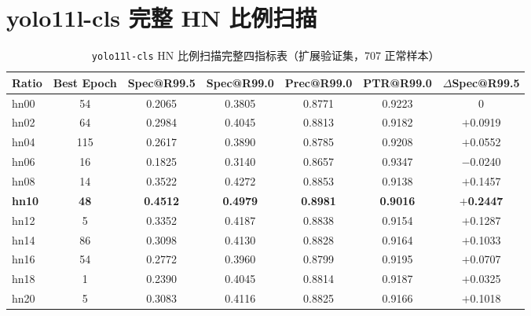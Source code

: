 \documentclass[UTF8,openany,12pt]{ctexbook}
\begin{document}
\section{yolo11l-cls 完整 HN 比例扫描}
\begin{table}[H]
    \centering
    \caption{\texttt{yolo11l-cls} HN 比例扫描完整四指标表（扩展验证集，707 正常样本）}
    \label{tab:hn-l-full-sweep}
    \begin{tabular}{lcccccc}
        \toprule
        Ratio & Best Epoch & Spec@R99.5 & Spec@R99.0 & Prec@R99.0 & PTR@R99.0 & $\Delta$Spec@R99.5 \\
        \midrule
        hn00 & 54  & 0.2065 & 0.3805 & 0.8771 & 0.9223 & 0 \\
        hn02 & 64  & 0.2984 & 0.4045 & 0.8813 & 0.9182 & $+$0.0919 \\
        hn04 & 115 & 0.2617 & 0.3890 & 0.8785 & 0.9208 & $+$0.0552 \\
        hn06 & 16  & 0.1825 & 0.3140 & 0.8657 & 0.9347 & $-$0.0240 \\
        hn08 & 14  & 0.3522 & 0.4272 & 0.8853 & 0.9138 & $+$0.1457 \\
        \textbf{hn10} & \textbf{48} & \textbf{0.4512} & \textbf{0.4979} & \textbf{0.8981} & \textbf{0.9016} & $\boldsymbol{+}$\textbf{0.2447} \\
        hn12 & 5   & 0.3352 & 0.4187 & 0.8838 & 0.9154 & $+$0.1287 \\
        hn14 & 86  & 0.3098 & 0.4130 & 0.8828 & 0.9164 & $+$0.1033 \\
        hn16 & 54  & 0.2772 & 0.3960 & 0.8799 & 0.9195 & $+$0.0707 \\
        hn18 & 1   & 0.2390 & 0.4045 & 0.8814 & 0.9187 & $+$0.0325 \\
        hn20 & 5   & 0.3083 & 0.4116 & 0.8825 & 0.9166 & $+$0.1018 \\
        \bottomrule
    \end{tabular}
\end{table}
\end{document}

